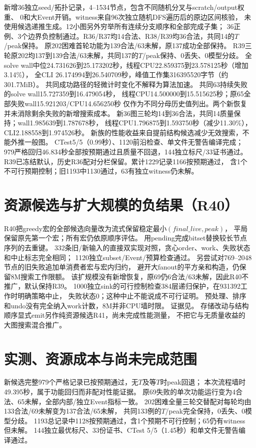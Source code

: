 \documentclass[UTF8,fontset=fandol,11pt]{ctexart}
\begin{document}
新增36独立seed/拓扑记录，4--1534节点，包含不同随机分叉与scratch/output权重、
0和大Event开销。witness来自96次独立随机DFS遍历后的原边区间核验，
未使用候选递推生成。12小图另外穷举所有连续分支顺序和全部完成子集；
36正例、3个边界负控制通过。R36/R37均14合法、R38/R39均36合法，共同14的$T$/peak保持。
原202困难首轮功能为139合法/63未解，原137成功全部保持。
R39三轮原202均137到139合法/63未解，共同137的$T$/peak保持、0丢失、0模型分歧。
全solve wall中位24.731626到25.173202秒，线程CPU22.859375到23.578125秒（增加3.14\%），
全CLI 26.174994到26.540709秒，峰值工作集316395520字节（约301.7MiB）。
共同成功路径的轻微计时变化不解释为算法加速。
共同63持续失败的solve wall15.727359到16.479054秒，
线程CPU14.500000到15.515625秒；原65全部失败wall15.921203/CPU14.656250秒
仅作为不同分母历史值列出。两个新恢复并未消除剩余失败的新增搜索成本。
新36图三轮均14到36合法，共同14质量保持；wall1.985639到1.787678秒，
线程CPU1.796875到1.593750秒（减少11.30\%），CLI2.188558到1.974526秒。
新族的性能收益来自提前结构候选减少无效搜索，不能外推一般图。
CTest5/5（0.99秒）、1120前沿检查、单文件无警告编译完成；
979严格回归46.834秒全部按预期通过且质量不回退，144独立标尺/33证书通过。
R39已冻结默认，历史R36配对分栏保留。累计1229记录1166按预期通过，
含1个不可行预期控制；旧1193中1130通过，63有独立witness仍未解。

\section{资源候选与扩大规模的负结果（R40）}
R40把greedy宏的全部候选向量改为流式保留稳定最小$(final\_live,peak)$，
平局保留原先第一个宏；所有宏仍依原顺序评估。
用pending完成bitset替换较长节点序列的去重键。
332条旧/新输入的直接双实现对照，贪心order、work、失败状态和中止标志完全相同；
1120独立subset/Event/预算检查通过。
另尝试对769--2048节点的旧失败追加单消费者宏与宏内归约，
避开大fanout的平方亲和构造，仍保留8M搜索工作限额。
该扩规模没有新增恢复，原69仍6合法/63未解，因此R40不推广，默认保持R39。
1000独立sink的可行控制检查384层递归保护，在931392工作时明确策略中止，
失败状态0；这种中止不能说成不可行证明。
预处理、排序和undo没有完全纳入work计数，8M并非CPU墙时限。
证据见。
存储改动与结构顺序显式emit另作纯资源候选R41，尚未完成性能测量，
不把它与无质量收益的大图搜索混合推广。

\section{实测、资源成本与尚未完成范围}
新候选完整979个严格记录已按预期通过，无$T$及等$T$时peak回退；
本次流程墙时49.395秒，属于功能回归而非配对性能证据。
原69失败的单次功能运行变为4合法、65未解，全部内部/独立Event指标一致。
202困难全量三轮交替配对每轮均由133合法/69未解变为137合法/65未解，
共同133例的$T$/peak完全保持，0丢失、0模型分歧。
1193总记录中1128按预期通过，含1个预期不可行控制；65仍有witness但未解。
144独立最优标尺、33份证书、CTest 5/5（1.45秒）和单文件无警告编译通过。
\end{document}
